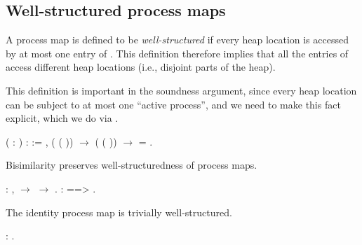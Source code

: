 \documentclass[12pt]{report}
\begin{document}
\subsection{Well-structured process maps}



 A process map  is defined to be \textit{well-structured}
    if every heap location  is accessed by at most one entry of .
    This definition therefore implies that all the entries of 
    access different heap locations (i.e., disjoint parts of the heap). 

 This definition is important in the soundness argument,
    since every heap location can be subject to at most one
    ``active process'', and we need to make this fact explicit,
    which we do via . \begin{coqdoccode}
\coqdocemptyline
\coqdocnoindent
{}  ( : ) :  :=\coqdoceol
\coqdocindent{1.00em}
\coqdockw{\ensuremath{\forall}}   ,\coqdoceol
\coqdocindent{2.00em}
  ( ( )) \ensuremath{\rightarrow}   ( ( )) \ensuremath{\rightarrow}  = .\coqdoceol
\coqdocemptyline
\end{coqdoccode}
Bisimilarity preserves well-structuredness of process maps. \begin{coqdoccode}
\coqdocemptyline
\coqdocnoindent
{}  :\coqdoceol
\coqdocindent{1.00em}
\coqdockw{\ensuremath{\forall}}  ,\coqdoceol
\coqdocindent{1.00em}
   \ensuremath{\rightarrow}   \ensuremath{\rightarrow}  .\coqdoceol
\coqdocnoindent
{}   : \coqdoceol
\coqdocindent{1.00em}
   ==>   .\coqdoceol
\coqdocemptyline
\end{coqdoccode}
The identity process map is trivially well-structured. \begin{coqdoccode}
\coqdocemptyline
\coqdocnoindent
{}  :  .\coqdoceol
 \coqdocemptyline
\end{coqdoccode}
\end{document}

